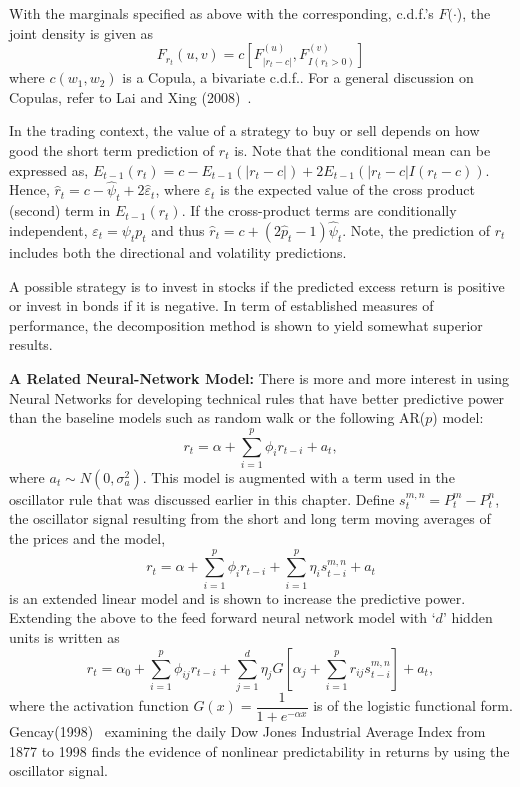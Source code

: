 With the marginals specified as above with the corresponding, c.d.f.'s $F(\cdot$), the joint density is given as
	\begin{equation}\label{eqn:frt}
	F_{r_t}(u,v) = c \left[ F_{\lvert r_t-c\rvert}^{(u)}, F_{I(r_t>0)}^{(v)} \right]
	\end{equation}
where $c(w_1, w_2)$ is a Copula, a bivariate c.d.f.. For a general discussion on Copulas, refer to Lai and Xing (2008)~\cite[Section 12.3.3]{lai1}.


In the trading context, the value of a strategy to buy or sell depends on how good the short term prediction of $r_{t}$ is. Note that the conditional mean can be expressed as, $E_{t-1}(r_t) = c - E_{t-1}(\left| r_t - c \right|) + 2 E_{t-1}(\left| r_t - c \right| I(r_t - c))$. Hence, $\hat{r}_{t} = c - \hat{\psi}_{t} + 2 \hat{\varepsilon}_t$, where $\varepsilon_t$ is the expected value of the cross product (second) term in $E_{t-1}(r_t)$. If the cross-product terms are conditionally independent, $\varepsilon_t = \psi_t p_t$ and thus $\hat{r}_t = c + (2\hat{p}_t - 1)\hat{\psi}_t$. Note, the prediction of $r_{t}$ includes both the directional and volatility predictions.


A possible strategy is to invest in stocks if the predicted excess return is positive or invest in bonds if it is negative. In term of established measures of performance, the decomposition method is shown to yield somewhat superior results. \twomedskip


\noindent\textbf{A Related Neural-Network Model:} There is more and more interest in using Neural Networks for developing technical rules that have better predictive power than the baseline models such as random walk or the following AR($p$) model:
	\begin{equation} \label{eqn:ri}
	r_t = \alpha + \sum_{i=1}^p\phi_ir_{t-i} + a_t,
	\end{equation}
where $a_t \sim N(0, \sigma_a^2)$. This model is augmented with a term used in the oscillator rule that was discussed earlier in this chapter. Define $s_t^{m,n} = P_t^m - P_t^n$, the oscillator signal resulting from the short and long term moving averages of the prices and the model,
	\begin{equation} \label{eqn:rtsum}
	r_t = \alpha + \sum_{i=1}^p\phi_ir_{t-i} + \sum_{i=1}^p\eta_is_{t-i}^{m,n}+ a_t
	\end{equation}
is an extended linear model and is shown to increase the predictive power. Extending the above to the feed forward neural network model with `$d$' hidden units is written as
	\begin{equation} \label{eqn:rtsum2}
	r_t = \alpha_0 + \sum_{i=1}^p \phi_{ij}r_{t-i} + \sum_{j=1}^d \eta_j G\left[\alpha_j + \sum_{i=1}^pr_{ij}s_{t-i}^{m,n} \right] + a_t,
	\end{equation}
where the activation function $G(x) = \dfrac{1}{1 + e^{-\alpha x}}$ is of the logistic functional form. Gencay(1998)~\cite{gencay} examining the daily Dow Jones Industrial Average Index from 1877 to 1998 finds the evidence of nonlinear predictability in returns by using the oscillator signal.



